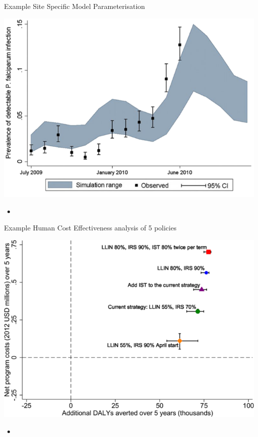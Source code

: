 \documentclass{beamer}
\begin{document}
\begin{frame}{Example Site Specific Model Parameterisation}


         \centering        
        \includegraphics[width=1\textwidth]{images/Sensitivity.png} 
        
\begin{itemize}
\item \cite{Stuckey2012}
\end{itemize}

\end{frame}

\begin{frame}{Example Human Cost Effectiveness analysis of 5 policies}


\centering
         \includegraphics[width=1\textwidth]{images/HealthPolicy.png}
\begin{itemize}
\item \cite{Stuckey2014}
\end{itemize}

\end{frame}
\end{document}

